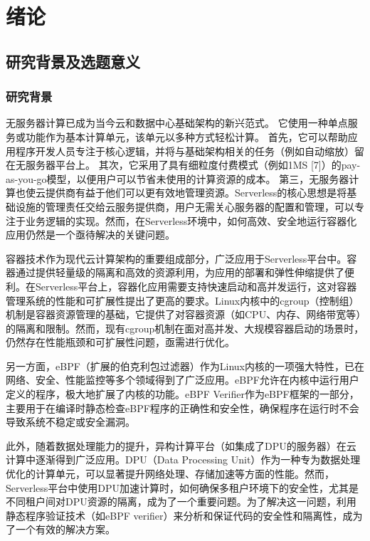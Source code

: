 \chapter{绪论}
\label{chap:intro}
\section{研究背景及选题意义}

\subsection{研究背景}

无服务器计算已成为当今云和数据中心基础架构的新兴范式。 它使用一种单点服务或功能作为基本计算单元，该单元以多种方式轻松计算。 首先，它可以帮助应用程序开发人员专注于核心逻辑，并将与基础架构相关的任务（例如自动缩放）留在无服务器平台上。 其次，它采用了具有细粒度付费模式（例如1MS [7]）的pay-as-you-go模型，以便用户可以节省未使用的计算资源的成本。 第三，无服务器计算也使云提供商有益于他们可以更有效地管理资源。Serverless的核心思想是将基础设施的管理责任交给云服务提供商，用户无需关心服务器的配置和管理，可以专注于业务逻辑的实现。然而，在Serverless环境中，如何高效、安全地运行容器化应用仍然是一个亟待解决的关键问题。


容器技术作为现代云计算架构的重要组成部分，广泛应用于Serverless平台中。容器通过提供轻量级的隔离和高效的资源利用，为应用的部署和弹性伸缩提供了便利。在Serverless平台上，容器化应用需要支持快速启动和高并发运行，这对容器管理系统的性能和可扩展性提出了更高的要求。Linux内核中的cgroup（控制组）机制是容器资源管理的基础，它提供了对容器资源（如CPU、内存、网络带宽等）的隔离和限制。然而，现有cgroup机制在面对高并发、大规模容器启动的场景时，仍然存在性能瓶颈和可扩展性问题，亟需进行优化。

另一方面，eBPF（扩展的伯克利包过滤器）作为Linux内核的一项强大特性，已在网络、安全、性能监控等多个领域得到了广泛应用。eBPF允许在内核中运行用户定义的程序，极大地扩展了内核的功能。eBPF Verifier作为eBPF框架的一部分，主要用于在编译时静态检查eBPF程序的正确性和安全性，确保程序在运行时不会导致系统不稳定或安全漏洞。

此外，随着数据处理能力的提升，异构计算平台（如集成了DPU的服务器）在云计算中逐渐得到广泛应用。DPU（Data Processing Unit）作为一种专为数据处理优化的计算单元，可以显著提升网络处理、存储加速等方面的性能。然而，Serverless平台中使用DPU加速计算时，如何确保多租户环境下的安全性，尤其是不同租户间对DPU资源的隔离，成为了一个重要问题。为了解决这一问题，利用静态程序验证技术（如eBPF verifier）来分析和保证代码的安全性和隔离性，成为了一个有效的解决方案。

